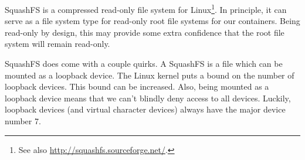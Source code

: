 SquashFS is a compressed read-only file system for Linux\footnote{See also
\url{http://squashfs.sourceforge.net/}.}. In principle, it can serve as a file
system type for read-only root file systems for our containers.  Being
read-only by design, this may provide some extra confidence that the root file
system will remain read-only.

SquashFS does come with a couple quirks. A SquashFS is a file which can be
mounted as a loopback device. The Linux kernel puts a bound on the number of
loopback devices. This bound can be increased.  Also, being mounted as a
loopback device means that we can't blindly deny access to all devices.
Luckily, loopback devices (and virtual character devices) always have the major
device number 7\cite{devices.txt-b}.
